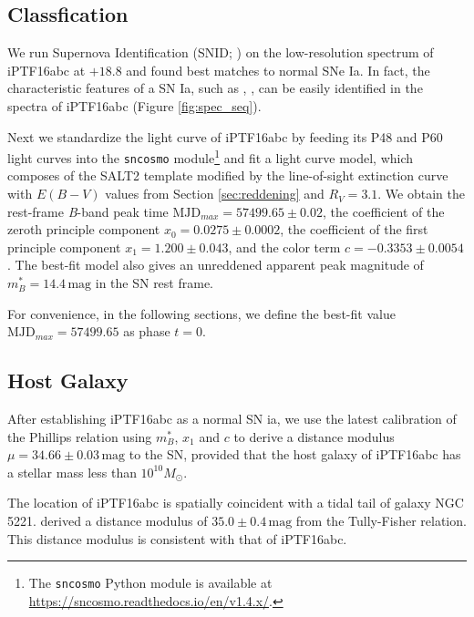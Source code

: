 \documentclass[twocolumn]{aastex61}
\newcommand{\sm}{M_\odot}
\begin{document}
\subsection{Classfication}
\label{sec:classification}

We run Supernova Identification (SNID; \citealt{2007ApJ...666.1024B})
on the low-resolution spectrum of iPTF16abc at $+18.8$ and found best
matches to normal SNe Ia. In fact, the characteristic features of a SN
Ia, such as , , can be easily identified in the
spectra of iPTF16abc (Figure \ref{fig:spec_seq}).

Next we standardize the light curve of iPTF16abc by feeding its P48
and P60 light curves into the \texttt{sncosmo} module\footnote{The
  \texttt{sncosmo} Python module is available at
  \url{https://sncosmo.readthedocs.io/en/v1.4.x/}.} and fit a light
curve model, which composes of the SALT2 template
\citep{2007A&A...466...11G} modified by the line-of-sight extinction
curve \citep{1999PASP..111...63F} with $E(B-V)$ values from Section
\ref{sec:reddening} and $R_V=3.1$. We obtain the rest-frame
\textit{B}-band peak time $\textrm{MJD}_{max}=57499.65\pm0.02$, the coefficient
of the zeroth principle component $x_0=0.0275\pm0.0002$, the
coefficient of the first principle component $x_1=1.200\pm0.043$, and
the color term $c=-0.3353\pm0.0054$. The best-fit model also gives an
unreddened apparent peak magnitude of $m^*_{B}=14.4\,\textrm{mag}$ in
the SN rest frame.

For convenience, in the following sections, we define the best-fit
value $\textrm{MJD}_{max}=57499.65$ as phase $t=0$.

\subsection{Host Galaxy}
\label{sec:host}

After establishing iPTF16abc as a normal SN ia, we use the latest
calibration \citep{2014A&A...568A..22B} of the Phillips relation
\citep{1993ApJ...413L.105P} using $m^*_{B}$, $x_1$ and $c$ to derive a
distance modulus $\mu=34.66\pm0.03\,\textrm{mag}$ to the SN, provided
that the host galaxy of iPTF16abc has a stellar mass less than
$10^{10}\sm$.

The location of iPTF16abc is spatially coincident with a tidal tail of
galaxy NGC\,5221. \citet{2007A&A...465...71T} derived a distance
modulus of $35.0\pm0.4\,\textrm{mag}$ from the Tully-Fisher
relation. This distance modulus is consistent with that of iPTF16abc.
\end{document}
